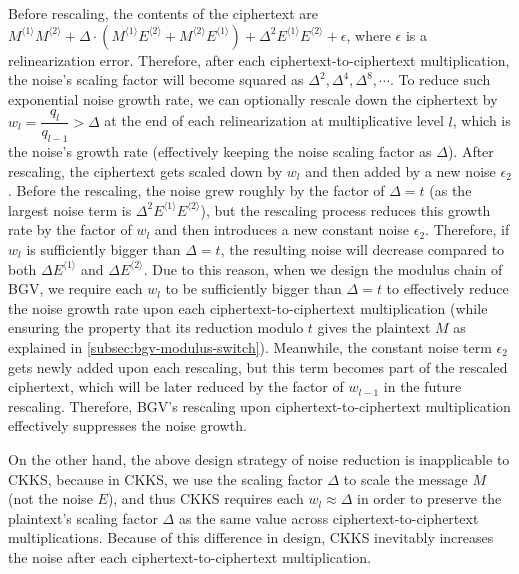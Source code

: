  Before rescaling, the contents of the ciphertext are $M^{\langle 1 \rangle}M^{\langle 2 \rangle} + \Delta\cdot (M^{\langle 1 \rangle}E^{\langle 2 \rangle} + M^{\langle 2 \rangle}E^{\langle 1 \rangle}) + \Delta^2E^{\langle 1 \rangle}E^{\langle 2 \rangle} + \epsilon$, where $\epsilon$ is a relinearization error. Therefore, after each ciphertext-to-ciphertext multiplication, the noise's scaling factor will become squared as $\Delta^2, \Delta^4, \Delta^8, \cdots$. To reduce such exponential noise growth rate, we can optionally rescale down the ciphertext by $w_l = \dfrac{q_l}{q_{l-1}} > \Delta$ at the end of each relinearization at multiplicative level $l$, which is the noise's growth rate (effectively keeping the noise scaling factor as $\Delta$). After rescaling, the ciphertext gets scaled down by $w_l$ and then added by a new noise $\epsilon_2$. Before the rescaling, the noise grew roughly by the factor of $\Delta = t$ (as the largest noise term is $\Delta^2 E^{\langle 1 \rangle} E^{\langle 2 \rangle}$), but the rescaling process reduces this growth rate by the factor of $w_l$ and then introduces a new constant noise $\epsilon_2$. Therefore, if $w_l$ is sufficiently bigger than $\Delta = t$, the resulting noise will decrease compared to both $\Delta E^{\langle 1 \rangle}$ and $\Delta E^{\langle 2 \rangle}$. Due to this reason, when we design the modulus chain of BGV, we require each $w_l$ to be sufficiently bigger than $\Delta = t$ to effectively reduce the noise growth rate upon each ciphertext-to-ciphertext multiplication (while ensuring the property that its reduction modulo $t$ gives the plaintext $M$ as explained in \autoref{subsec:bgv-modulus-switch}). Meanwhile, the constant noise term $\epsilon_2$ gets newly added upon each rescaling, but this term becomes part of the rescaled ciphertext, which will be later reduced by the factor of $w_{l-1}$ in the future rescaling. Therefore, BGV's rescaling upon ciphertext-to-ciphertext multiplication effectively suppresses the noise growth. 

On the other hand, the above design strategy of noise reduction is inapplicable to CKKS, because in CKKS, we use the scaling factor $\Delta$ to scale the message $M$ (not the noise $E$), and thus CKKS requires each $w_l \approx \Delta$ in order to preserve the plaintext's scaling factor $\Delta$ as the same value across ciphertext-to-ciphertext multiplications. Because of this difference in design, CKKS inevitably increases the noise after each ciphertext-to-ciphertext multiplication. 


